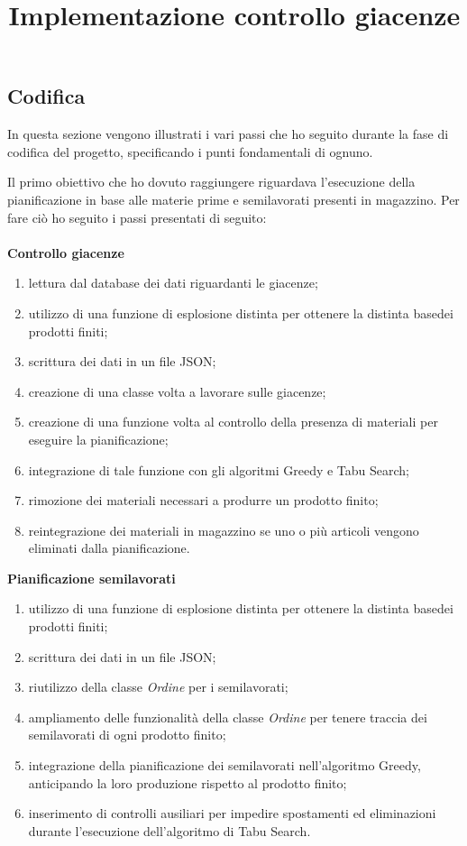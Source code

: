 \subsection{Codifica}

In questa sezione vengono illustrati i vari passi che ho seguito durante la fase di codifica del progetto, specificando i punti fondamentali di ognuno.\\

\title{Implementazione controllo giacenze}

Il primo obiettivo che ho dovuto raggiungere riguardava l'esecuzione della pianificazione in base alle materie prime e semilavorati presenti in magazzino.
Per fare ciò ho seguito i passi presentati di seguito:\\ \\
\textbf{Controllo giacenze}
\begin{enumerate}
        \item lettura dal database dei dati riguardanti le giacenze;
        \item utilizzo di una funzione di esplosione distinta per ottenere la distinta base\glosp dei prodotti finiti; 
        \item scrittura dei dati in un file JSON;
        \item creazione di una classe volta a lavorare sulle giacenze;
        \item creazione di una funzione volta al controllo della presenza di materiali per eseguire la pianificazione;
        \item integrazione di tale funzione con gli algoritmi Greedy e Tabu Search;
        \item rimozione dei materiali necessari a produrre un prodotto finito;
        \item reintegrazione dei materiali in magazzino se uno o più articoli vengono eliminati dalla pianificazione.\\
\end{enumerate}

\textbf{Pianificazione semilavorati} 
\begin{enumerate}
        \item utilizzo di una funzione di esplosione distinta per ottenere la distinta base\glosp dei prodotti finiti; 
        \item scrittura dei dati in un file JSON;
        \item riutilizzo della classe \textit{Ordine} per i semilavorati;
        \item ampliamento delle funzionalità della classe \textit{Ordine} per tenere traccia dei semilavorati di ogni prodotto finito;
        \item integrazione della pianificazione dei semilavorati nell'algoritmo Greedy, anticipando la loro produzione rispetto al prodotto finito;
        \item inserimento di controlli ausiliari per impedire spostamenti ed eliminazioni durante l'esecuzione dell'algoritmo di Tabu Search.\\
\end{enumerate}

